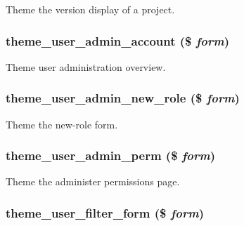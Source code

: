 Theme the version display of a project. \hypertarget{group__themeable_g637d49c0b74dae1daf92d089b4dbed58}{
\subsubsection[{theme\_\-user\_\-admin\_\-account}]{\setlength{\rightskip}{0pt plus 5cm}theme\_\-user\_\-admin\_\-account (\$ {\em form})}}
\label{group__themeable_g637d49c0b74dae1daf92d089b4dbed58}


Theme user administration overview. \hypertarget{group__themeable_g5bd193ccf822945c67e66021b0f2df9d}{
\subsubsection[{theme\_\-user\_\-admin\_\-new\_\-role}]{\setlength{\rightskip}{0pt plus 5cm}theme\_\-user\_\-admin\_\-new\_\-role (\$ {\em form})}}
\label{group__themeable_g5bd193ccf822945c67e66021b0f2df9d}


Theme the new-role form. \hypertarget{group__themeable_gf699cde524801368ec966785c8dfc0ee}{
\subsubsection[{theme\_\-user\_\-admin\_\-perm}]{\setlength{\rightskip}{0pt plus 5cm}theme\_\-user\_\-admin\_\-perm (\$ {\em form})}}
\label{group__themeable_gf699cde524801368ec966785c8dfc0ee}


Theme the administer permissions page. \hypertarget{group__themeable_g1efb227ccf11a707c5f8ebb2443ba4ee}{
\subsubsection[{theme\_\-user\_\-filter\_\-form}]{\setlength{\rightskip}{0pt plus 5cm}theme\_\-user\_\-filter\_\-form (\$ {\em form})}}
\label{group__themeable_g1efb227ccf11a707c5f8ebb2443ba4ee}


